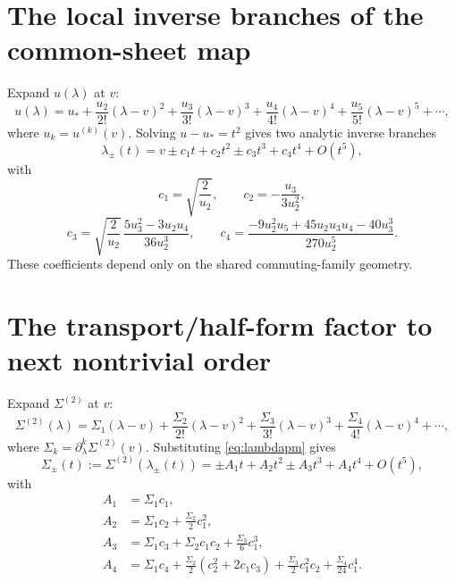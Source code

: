 \documentclass[11pt]{article}
\begin{document}
\section{The local inverse branches of the common-sheet map}

Expand $u(\lambda)$ at $v$:
\[
 u(\lambda)=u_*+\frac{u_2}{2!}(\lambda-v)^2+\frac{u_3}{3!}(\lambda-v)^3+\frac{u_4}{4!}(\lambda-v)^4+\frac{u_5}{5!}(\lambda-v)^5+\cdots,
\]
where $u_k=u^{(k)}(v)$.  Solving $u-u_*=t^2$ gives two analytic inverse branches
\begin{equation}
\label{eq:lambdapm}
 \lambda_\pm(t)=v\pm c_1 t+c_2 t^2\pm c_3 t^3+c_4 t^4+O(t^5),
\end{equation}
with
\begin{equation}
\label{eq:c-coeffs}
 c_1=\sqrt{\frac{2}{u_2}},
 \qquad
 c_2=-\frac{u_3}{3u_2^2},
\end{equation}
\begin{equation}
\label{eq:c3c4}
 c_3=\sqrt{\frac{2}{u_2}}\,\frac{5u_3^2-3u_2u_4}{36u_2^3},
 \qquad
 c_4=\frac{-9u_2^2u_5+45u_2u_3u_4-40u_3^3}{270u_2^5}.
\end{equation}
These coefficients depend only on the shared commuting-family geometry.

\section{The transport/half-form factor to next nontrivial order}

Expand $\Sigma^{(2)}$ at $v$:
\[
 \Sigma^{(2)}(\lambda)=\Sigma_1(\lambda-v)+\frac{\Sigma_2}{2!}(\lambda-v)^2+\frac{\Sigma_3}{3!}(\lambda-v)^3+\frac{\Sigma_4}{4!}(\lambda-v)^4+\cdots,
\]
where $\Sigma_k=\partial_\lambda^k\Sigma^{(2)}(v)$.  Substituting \eqref{eq:lambdapm} gives
\begin{equation}
\label{eq:Sigma-pm}
 \Sigma_\pm(t):=\Sigma^{(2)}(\lambda_\pm(t))=\pm A_1t+A_2t^2\pm A_3t^3+A_4t^4+O(t^5),
\end{equation}
with
\begin{align}
\label{eq:A1234}
 A_1&=\Sigma_1 c_1,
\nonumber\\
 A_2&=\Sigma_1 c_2+\frac{\Sigma_2}{2}c_1^2,
\\
 A_3&=\Sigma_1 c_3+\Sigma_2 c_1c_2+\frac{\Sigma_3}{6}c_1^3,
\nonumber\\
 A_4&=\Sigma_1 c_4+\frac{\Sigma_2}{2}(c_2^2+2c_1c_3)+\frac{\Sigma_3}{2}c_1^2c_2+\frac{\Sigma_4}{24}c_1^4.
\nonumber
\end{align}
\end{document}
